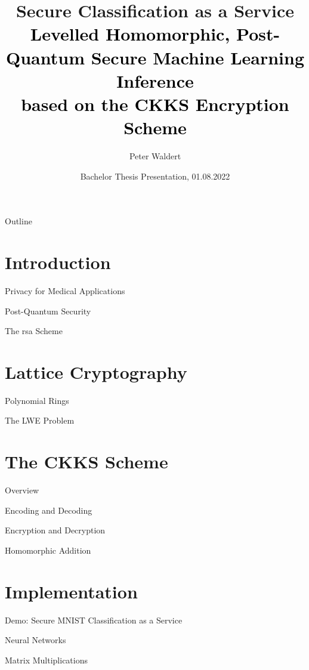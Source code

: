 \documentclass[aspectratio=169]{beamer}
\title[Secure Classification as a Service]{
  Secure Classification as a Service \\
  \small\normalfont\textcolor{black}{
    Levelled Homomorphic, Post-Quantum Secure Machine Learning Inference \\
    based on the CKKS Encryption Scheme
  }
}
\author{Peter Waldert}
\date{Bachelor Thesis Presentation, 01.08.2022}
\institute{IAIK}
\begin{document}
  \begin{frame}[plain]
    \maketitle
  \end{frame}

  \begin{frame}{Outline}
    \tableofcontents
  \end{frame}

  \section{Introduction}
  \begin{frame}{Privacy for Medical Applications}\end{frame}
  \begin{frame}{Post-Quantum Security}\end{frame}
  \begin{frame}{The \gls{rsa} Scheme}\end{frame}
  \section{Lattice Cryptography}
  \begin{frame}{Polynomial Rings}\end{frame}
  \begin{frame}{The LWE Problem}\end{frame}
  \section{The CKKS Scheme}
  \begin{frame}{Overview}
    \cite{2017-ckks-original}
  \end{frame}
  \begin{frame}{Encoding and Decoding}\end{frame}
  \begin{frame}{Encryption and Decryption}\end{frame}
  \begin{frame}{Homomorphic Addition}\end{frame}
  \section{Implementation}
  \begin{frame}{Demo: Secure MNIST Classification as a Service}\end{frame}
  \begin{frame}{Neural Networks}\end{frame}
  \begin{frame}{Matrix Multiplications}\end{frame}
\end{document}

